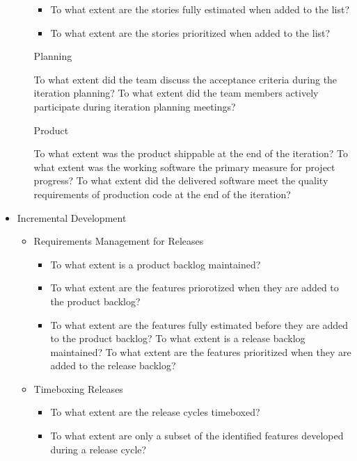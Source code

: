 \begin{appendices}
\begin{itemize}
\begin{itemize}
\begin{itemize}
					\item To what extent are the stories fully estimated when added to the list?
					\item To what extent are the stories prioritized when added to the list?
				\end{itemize}
			\addition Planning
				\begin{itemize}
					\addition To what extent did the team discuss the acceptance criteria during the iteration planning?
					\addition To what extent did the team members actively participate during iteration planning meetings?
				\end{itemize}
			\addition Product
				\begin{itemize}
					\addition To what extent was the product shippable at the end of the iteration?
					\addition To what extent was the working software the primary measure for project progress?
					\addition To what extent did the delivered software meet the quality requirements of production code at the end of the iteration?
				\end{itemize}
		\end{itemize}
	\item Incremental Development
		\begin{itemize}
			\item Requirements Management for Releases
				\begin{itemize}
					\item To what extent is a product backlog maintained?
					\item To what extent are the features priorotized when they are added to the product backlog?
					\item To what extent are the features fully estimated before they are added to the product backlog?
					\addition To what extent is a release backlog maintained?
					\addition To what extent are the features prioritized when they are added to the release backlog?
				\end{itemize}
			\item Timeboxing Releases
				\begin{itemize}
					\item To what extent are the release cycles timeboxed?
					\item To what extent are only a subset of the identified features developed during a release cycle?
				\end{itemize}
		\end{itemize}

\end{itemize}
\end{appendices}
